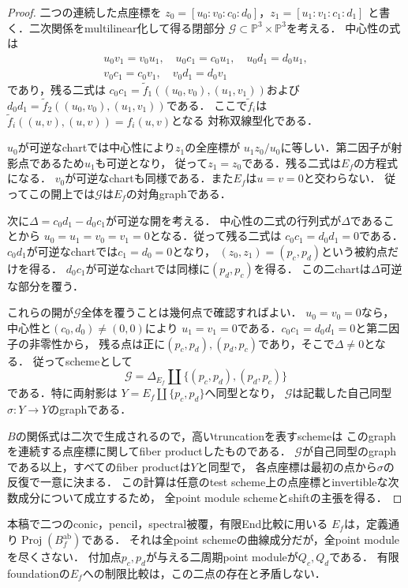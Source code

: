 \begin{proof}
二つの連続した点座標を
$z_0=[u_0:v_0:c_0:d_0]$，$z_1=[u_1:v_1:c_1:d_1]$
と書く．二次関係をmultilinear化して得る閉部分
$\mathcal G\subset\mathbb P^3\times\mathbb P^3$を考える．
中心性の式は
\[
 \begin{gathered}
 u_0v_1=v_0u_1,\quad
 u_0c_1=c_0u_1,\quad u_0d_1=d_0u_1,\\
 v_0c_1=c_0v_1,\quad v_0d_1=d_0v_1
 \end{gathered}
\]
であり，残る二式は
$c_0c_1=\widetilde f_1((u_0,v_0),(u_1,v_1))$および
$d_0d_1=\widetilde f_2((u_0,v_0),(u_1,v_1))$である．
ここで$\widetilde f_i$は$\widetilde f_i((u,v),(u,v))=f_i(u,v)$となる
対称双線型化である．

$u_0$が可逆なchartでは中心性により$z_1$の全座標が
$u_1z_0/u_0$に等しい．第二因子が射影点であるため$u_1$も可逆となり，
従って$z_1=z_0$である．残る二式は$E_f$の方程式になる．
$v_0$が可逆なchartも同様である．また$E_f$は$u=v=0$と交わらない．
従ってこの開上では$\mathcal G$は$E_f$の対角graphである．

次に$\Delta=c_0d_1-d_0c_1$が可逆な開を考える．
中心性の二式の行列式が$\Delta$であることから
$u_0=u_1=v_0=v_1=0$となる．従って残る二式は
$c_0c_1=d_0d_1=0$である．
$c_0d_1$が可逆なchartでは$c_1=d_0=0$となり，
$(z_0,z_1)=(p_c,p_d)$という被約点だけを得る．
$d_0c_1$が可逆なchartでは同様に$(p_d,p_c)$を得る．
この二chartは$\Delta$可逆な部分を覆う．

これらの開が$\mathcal G$全体を覆うことは幾何点で確認すればよい．
$u_0=v_0=0$なら，中心性と$(c_0,d_0)\ne(0,0)$により
$u_1=v_1=0$である．$c_0c_1=d_0d_1=0$と第二因子の非零性から，
残る点は正に$(p_c,p_d),(p_d,p_c)$であり，そこで$\Delta\ne0$となる．
従ってschemeとして
\[
 \mathcal G=\Delta_{E_f}\amalg\{(p_c,p_d),(p_d,p_c)\}
\]
である．特に両射影は
$Y=E_f\amalg\{p_c,p_d\}$へ同型となり，
$\mathcal G$は記載した自己同型$\sigma:Y\to Y$のgraphである．

$B$の関係式は二次で生成されるので，高いtruncationを表すschemeは
このgraphを連続する点座標に関してfiber productしたものである．
$\mathcal G$が自己同型のgraphである以上，すべてのfiber productは$Y$と同型で，
各点座標は最初の点から$\sigma$の反復で一意に決まる．
この計算は任意のtest scheme上の点座標とinvertibleな次数成分について成立するため，
全point module schemeとshiftの主張を得る．
\end{proof}

\begin{remark}[既存の可換点曲線との関係]
本稿で二つのconic，pencil，spectral被覆，有限End比較に用いる
$E_f$は，定義通り$\operatorname{Proj}(B_f^{\mathrm{ab}})$である．
それは全point schemeの曲線成分だが，全point moduleを尽くさない．
付加点$p_c,p_d$が与える二周期point moduleが$Q_c,Q_d$である．
有限foundationの$E_f$への制限比較は，この二点の存在と矛盾しない．
\end{remark}

